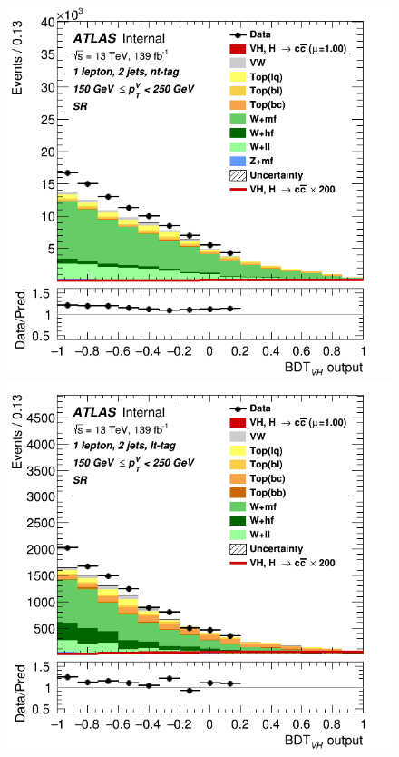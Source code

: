 \begin{figure}[h!]
\center
\includegraphics[scale=0.2753]{Images/VH/SRsandTopCRs/Region_distmva_DSR_BMax250_L1_Y6051_TTypent_T1_J2_BMin150_Prefit.png}
\includegraphics[scale=0.2753]{Images/VH/SRsandTopCRs/Region_distmva_DSR_BMax250_L1_Y6051_TTypelt_T2_J2_BMin150_Prefit.png}

\end{figure}
